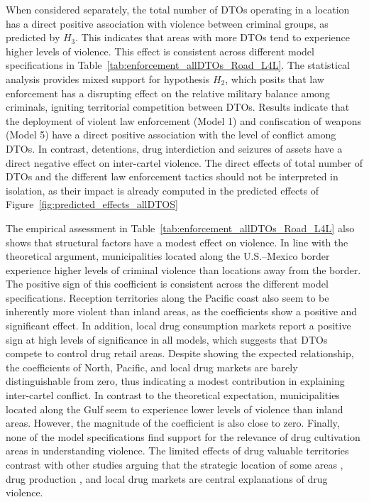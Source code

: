 \documentclass[12pt,letterpaper]{article}
\begin{document}
When considered separately, the total number of DTOs operating in a location has a direct positive association with violence between criminal groups, as predicted by $H_{3}$. This indicates that areas with more DTOs tend to experience higher levels of violence. This effect is consistent across different model specifications in Table~\ref{tab:enforcement_allDTOs_Road_L4L}. The statistical analysis provides mixed support for hypothesis $H_{2}$, which posits that law enforcement has a disrupting effect on the relative military balance among criminals, igniting territorial competition between DTOs. Results indicate that the deployment of violent law enforcement (Model 1) and confiscation of weapons (Model 5) have a direct positive association with the level of conflict among DTOs. In contrast, detentions, drug interdiction and seizures of assets have a direct negative effect on inter-cartel violence. The direct effects of total number of DTOs and the different law enforcement tactics should not be interpreted in isolation, as their impact is already computed in the predicted effects of  Figure~\ref{fig:predicted_effects_allDTOS}


The empirical assessment in Table~\ref{tab:enforcement_allDTOs_Road_L4L} also shows that structural factors have a modest effect on violence. In line with the theoretical argument, municipalities located along the U.S.--Mexico border experience higher levels of criminal violence than locations away from the border. The positive sign of this coefficient is consistent across the different model specifications. Reception territories along the Pacific coast also seem to be inherently more violent than inland areas, as the coefficients show a positive and significant effect. In addition, local drug consumption markets report a positive sign at high levels of significance in all models, which suggests that DTOs compete to control drug retail areas. Despite showing the expected relationship, the coefficients of North, Pacific, and local drug markets are barely distinguishable from zero, thus indicating a modest contribution in explaining inter-cartel conflict. In contrast to the theoretical expectation, municipalities located along the Gulf seem to experience lower levels of violence than inland areas. However, the magnitude of the coefficient is also close to zero. Finally, none of the model specifications find support for the relevance of drug cultivation areas in understanding violence. The limited effects of drug valuable territories contrast with other studies arguing that the strategic location of some areas \citep{Osorio2012}, drug production \citep{Angrist2008}, and local drug markets \citep{Rios2012a} are central explanations of drug violence. 
\end{document}
